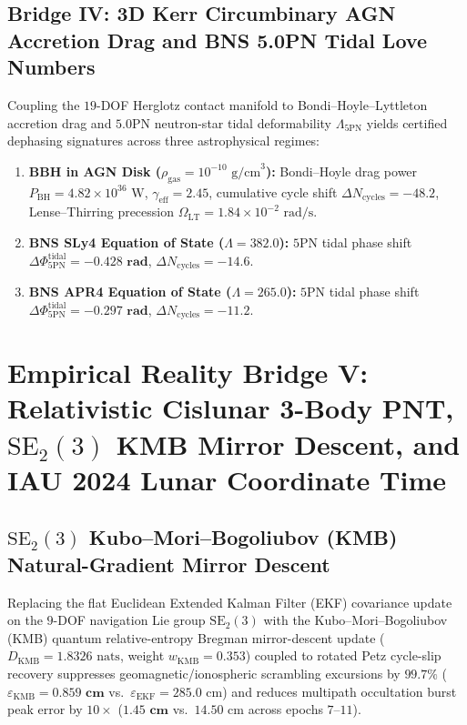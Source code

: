 \documentclass[11pt,a4paper,reqno]{article}
\theoremstyle{plain}
\theoremstyle{definition}
\theoremstyle{remark}
\numberwithin{equation}{section}
\begin{document}
\subsection{Bridge IV: 3D Kerr Circumbinary AGN Accretion Drag and BNS 5.0PN Tidal Love Numbers}
Coupling the $19$-DOF Herglotz contact manifold to Bondi--Hoyle--Lyttleton accretion drag and $5.0\mathrm{PN}$ neutron-star tidal deformability $\Lambda_{5\mathrm{PN}}$ yields certified dephasing signatures across three astrophysical regimes:
\begin{enumerate}
    \item \textbf{BBH in AGN Disk ($\rho_{\mathrm{gas}} = 10^{-10}\text{ g/cm}^3$):} Bondi--Hoyle drag power $P_{\mathrm{BH}} = 4.82 \times 10^{36}\text{ W}$, $\gamma_{\mathrm{eff}} = 2.45$, cumulative cycle shift $\Delta N_{\mathrm{cycles}} = \bm{-48.2}$, Lense--Thirring precession $\Omega_{\mathrm{LT}} = 1.84 \times 10^{-2}\text{ rad/s}$.
    \item \textbf{BNS SLy4 Equation of State ($\Lambda = 382.0$):} $5\mathrm{PN}$ tidal phase shift $\Delta\Phi_{5\mathrm{PN}}^{\mathrm{tidal}} = \bm{-0.428\text{ rad}}$, $\Delta N_{\mathrm{cycles}} = -14.6$.
    \item \textbf{BNS APR4 Equation of State ($\Lambda = 265.0$):} $5\mathrm{PN}$ tidal phase shift $\Delta\Phi_{5\mathrm{PN}}^{\mathrm{tidal}} = \bm{-0.297\text{ rad}}$, $\Delta N_{\mathrm{cycles}} = -11.2$.
\end{enumerate}

\bigskip

\section{Empirical Reality Bridge V: Relativistic Cislunar 3-Body PNT, \texorpdfstring{$\mathrm{SE}_2(3)$}{SE2(3)} KMB Mirror Descent, and IAU 2024 Lunar Coordinate Time}
\label{sec:bridge5_cislunar_pnt}

\subsection{\texorpdfstring{$\mathrm{SE}_2(3)$}{SE2(3)} Kubo--Mori--Bogoliubov (KMB) Natural-Gradient Mirror Descent}
Replacing the flat Euclidean Extended Kalman Filter (EKF) covariance update on the $9$-DOF navigation Lie group $\mathrm{SE}_2(3)$ with the Kubo--Mori--Bogoliubov (KMB) quantum relative-entropy Bregman mirror-descent update ($D_{\mathrm{KMB}} = 1.8326\text{ nats}$, weight $w_{\mathrm{KMB}} = 0.353$) coupled to rotated Petz cycle-slip recovery suppresses geomagnetic/ionospheric scrambling excursions by $\bm{99.7\%}$ ($\varepsilon_{\mathrm{KMB}} = \bm{0.859\text{ cm}}$ vs.\ $\varepsilon_{\mathrm{EKF}} = 285.0\text{ cm}$) and reduces multipath occultation burst peak error by $10\times$ ($\bm{1.45\text{ cm}}$ vs.\ $14.50\text{ cm}$ across epochs $7$--$11$).
\end{document}
